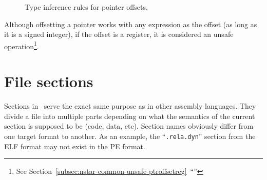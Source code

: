 \begin{figure}[H]
	\centering


	\caption{Type inference rules for pointer offsets.}
	\label{fig:nstar-common-expressions-pointeroffsets-typerules}
\end{figure}

Although offsetting a pointer works with any expression as the offset (as long as it is a signed integer), if the offset is a register, it is considered an unsafe operation\footnote{See Section~\ref{subsec:nstar-common-unsafe-ptroffsetreg}~``''}.

\section{File sections}\label{sec:nstar-common-sections}

Sections in \nstar\ serve the exact same purpose as in other assembly languages. They divide a file into multiple parts depending on what the semantics of the current section is supposed to be (code, data, etc).
Section names obviously differ from one target format to another. As an example, the ``\texttt{.rela.dyn}'' section from the ELF format may not exist in the PE format.

